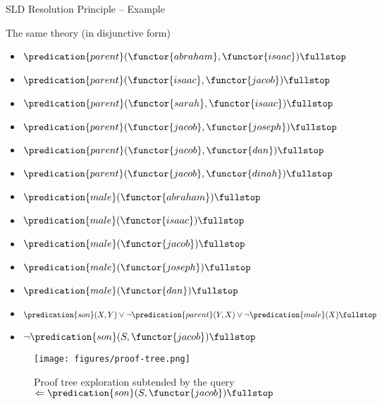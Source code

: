 \documentclass[presentation]{beamer}\mode<presentation>{\usetheme{AMSBolognaFC}}
\begin{document}
\begin{frame}[allowframebreaks]{SLD Resolution Principle -- Example}
    \begin{alertblock}{The same theory (in disjunctive form)}
        \begin{multicols}{2}
            \begin{itemize}
                \item $\predication{parent}(\functor{abraham}, \functor{isaac}) \fullstop$
                \item $\predication{parent}(\functor{isaac}, \functor{jacob}) \fullstop$
                \item $\predication{parent}(\functor{sarah}, \functor{isaac}) \fullstop$
                \item $\predication{parent}(\functor{jacob}, \functor{joseph}) \fullstop$
                \item $\predication{parent}(\functor{jacob}, \functor{dan}) \fullstop$
                \item $\predication{parent}(\functor{jacob}, \functor{dinah}) \fullstop$
                \item $\predication{male}(\functor{abraham}) \fullstop$
                \item $\predication{male}(\functor{isaac}) \fullstop$
                \item $\predication{male}(\functor{jacob}) \fullstop$
                \item $\predication{male}(\functor{joseph}) \fullstop$
                \item $\predication{male}(\functor{dan}) \fullstop$
            \end{itemize}
        \end{multicols}
        \begin{itemize}
            \item $\predication{son}(X, Y) \vee \neg\predication{parent}(Y, X) \vee \neg\predication{male}(X) \fullstop$
            \item $\neg\predication{son}(S, \functor{jacob}) \fullstop$
        \end{itemize}
    \end{alertblock}

    \begin{figure}
        \texttt{[image: figures/proof-tree.png]}
        \caption{Proof tree exploration subtended by the query $\Leftarrow \predication{son}(S, \functor{jacob}) \fullstop$}
    \end{figure}
\end{frame}
\end{document}

